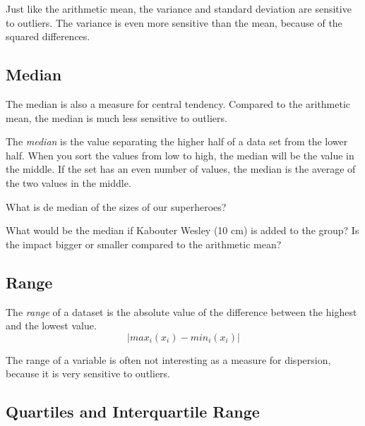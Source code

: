 Just like the arithmetic mean, the variance and standard deviation are sensitive to outliers. The variance is even more sensitive than the mean, because of the squared differences.

\subsection{Median}
\label{ssec:median}

The median is also a measure for central tendency. Compared to the arithmetic mean, the median is much less sensitive to outliers.

\begin{definition}[Median]
    The \emph{median} is the value separating the higher half of a data set from the lower half. When you sort the values from low to high, the median will be the value in the middle. If the set has an even number of values, the median is the average of the two values in the middle. 
\end{definition}

\begin{exercise}
    What is de median of the sizes of our superheroes?
\end{exercise}

\begin{exercise}
    What would be the median if Kabouter Wesley (10 cm) is added to the group? 
    Is the impact bigger or smaller compared to the arithmetic mean?
\end{exercise}

\subsection{Range}
\label{ssec:range}

\begin{definition}[Range]
    The \emph{range} of a dataset is the absolute value of the difference between the highest and the lowest value.
    \begin{equation}
    | max_i(x_i) - min_i(x_i) |
    \end{equation}    
\end{definition}

The range of a variable is often not interesting as a measure for dispersion, because it is very sensitive to outliers.


\subsection{Quartiles and Interquartile Range}
\label{ssec:quartiles}

